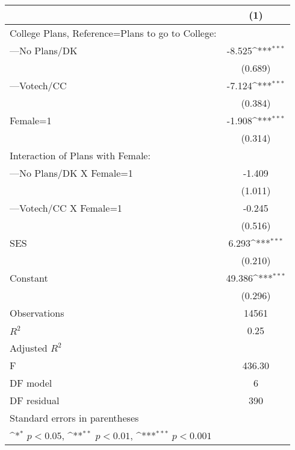 {
\def\sym#1{\ifmmode^{#1}\else\(^{#1}\)\fi}
\begin{tabular}{l*{1}{c}}
\hline\hline
                                                  &\multicolumn{1}{c}{(1)}         \\
\hline
College Plans, Reference=Plans to go to College:  &                     \\
[1em]
---No Plans/DK                                    &      -8.525\sym{***}\\
                                                  &     (0.689)         \\
[1em]
---Votech/CC                                      &      -7.124\sym{***}\\
                                                  &     (0.384)         \\
[1em]
Female=1                                          &      -1.908\sym{***}\\
                                                  &     (0.314)         \\
[1em]
Interaction of Plans with Female:                 &                     \\
[1em]
---No Plans/DK X Female=1                         &      -1.409         \\
                                                  &     (1.011)         \\
[1em]
---Votech/CC X Female=1                           &      -0.245         \\
                                                  &     (0.516)         \\
[1em]
SES                                               &       6.293\sym{***}\\
                                                  &     (0.210)         \\
[1em]
Constant                                          &      49.386\sym{***}\\
                                                  &     (0.296)         \\
\hline
Observations                                      &       14561         \\
\(R^{2}\)                                         &        0.25         \\
Adjusted \(R^{2}\)                                &                     \\
F                                                 &      436.30         \\
DF model                                          &           6         \\
DF residual                                       &         390         \\
\hline\hline
\multicolumn{2}{l}{\footnotesize Standard errors in parentheses}\\
\multicolumn{2}{l}{\footnotesize \sym{*} \(p<0.05\), \sym{**} \(p<0.01\), \sym{***} \(p<0.001\)}\\
\end{tabular}
}
